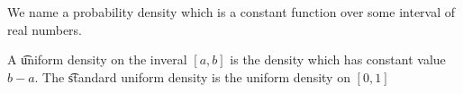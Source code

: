 

We name a probability density which is a constant function over some interval of real numbers.


A \t{uniform density} on the inveral $[a, b]$ is the density which has constant value $b - a$.
The \t{standard uniform density} is the uniform density on $[0, 1]$

\blankpage
